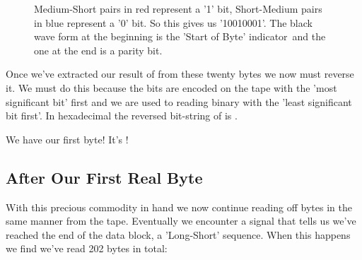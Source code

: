 \begin{figure}[H]
{
	\begin{adjustbox}{width=14cm,center}
    \end{adjustbox}
}\caption[]{Medium-Short pairs in red represent a '1' bit, Short-Medium pairs in blue represent a '0' bit. So this gives
us '10010001'. The black wave form at the beginning is the 'Start of Byte' indicator\, and the one at the end is a parity bit.}
\end{figure}
Once we've extracted our result of  from these twenty bytes we now must reverse it. We must do this because
the bits are encoded on the tape with the 'most significant bit' first and we are used to reading binary with the 'least significant bit
first'. In hexadecimal the reversed bit-string of  is .

We have our first byte! It's ! 

\subsection{After Our First Real Byte}
With this precious commodity in hand we now continue reading off bytes in the same manner from the tape. Eventually we encounter
a signal that tells us we've reached the end of the data block, a 'Long-Short' sequence. When this happens we find we've
read 202 bytes in total:

